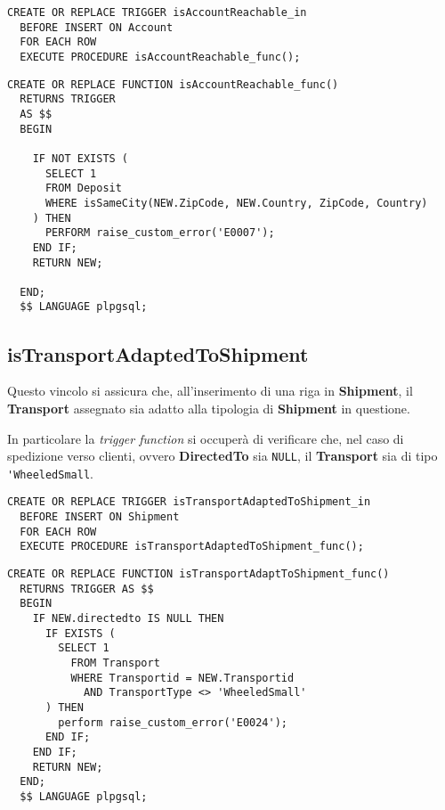 \begin{lstlisting}[caption={Trigger per il vincolo \textbf{isAccountReachable}}]
  CREATE OR REPLACE TRIGGER isAccountReachable_in
  BEFORE INSERT ON Account
  FOR EACH ROW
  EXECUTE PROCEDURE isAccountReachable_func();
\end{lstlisting}

\begin{lstlisting}[caption={Funzione per il vincolo \textbf{isAccountReachable}}]
  CREATE OR REPLACE FUNCTION isAccountReachable_func()
  RETURNS TRIGGER
  AS $$
  BEGIN

    IF NOT EXISTS (
      SELECT 1
      FROM Deposit
      WHERE isSameCity(NEW.ZipCode, NEW.Country, ZipCode, Country)
    ) THEN
      PERFORM raise_custom_error('E0007');
    END IF;
    RETURN NEW;

  END;
  $$ LANGUAGE plpgsql;
\end{lstlisting}

\subsection{\textbf{isTransportAdaptedToShipment}}

Questo vincolo si assicura che, all'inserimento di una riga in \textbf{Shipment}, il \textbf{Transport} assegnato sia adatto alla tipologia di \textbf{Shipment} in questione.

In particolare la \textit{trigger function} si occuperà di verificare che, nel caso di spedizione verso clienti, ovvero \textbf{DirectedTo} sia \lstinline{NULL}, il \textbf{Transport} sia di tipo \lstinline{'WheeledSmall}.

\begin{lstlisting}[caption={Trigger per il vincolo \textbf{isTransportAdaptedToShipment}}]
  CREATE OR REPLACE TRIGGER isTransportAdaptedToShipment_in
  BEFORE INSERT ON Shipment
  FOR EACH ROW
  EXECUTE PROCEDURE isTransportAdaptedToShipment_func();
\end{lstlisting}

\begin{lstlisting}[caption={Funzione per il vincolo \textbf{isTransportAdaptedToShipment}}]
  CREATE OR REPLACE FUNCTION isTransportAdaptToShipment_func()
  RETURNS TRIGGER AS $$
  BEGIN
    IF NEW.directedto IS NULL THEN
      IF EXISTS (
        SELECT 1
          FROM Transport
          WHERE Transportid = NEW.Transportid
            AND TransportType <> 'WheeledSmall'
      ) THEN
        perform raise_custom_error('E0024');
      END IF;
    END IF;
    RETURN NEW;
  END;
  $$ LANGUAGE plpgsql;
\end{lstlisting}

